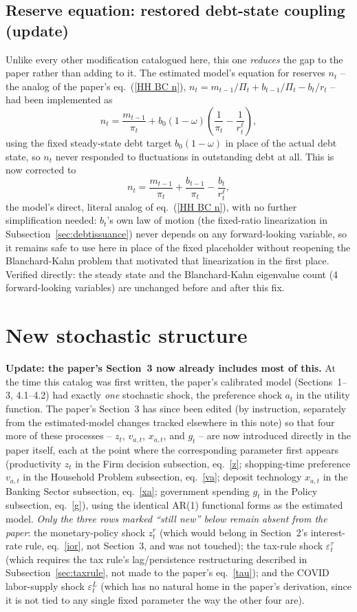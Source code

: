 \documentclass[11pt]{article}
\begin{document}
\subsection{Reserve equation: restored debt-state coupling (update)}
\label{sec:reserve}
Unlike every other modification catalogued here, this one \emph{reduces}
the gap to the paper rather than adding to it. The estimated model's
equation for reserves $n_t$ -- the analog of the paper's
eq.~(\ref{HH BC n}), $n_t = m_{t-1}/\Pi_t + b_{t-1}/\Pi_t - b_t/r_t$ --
had been implemented as
\[
n_t = \frac{m_{t-1}}{\pi_t} + b_0(1-\omega)\left(\frac{1}{\pi_t}-\frac{1}{r^\ell_t}\right),
\]
using the fixed steady-state debt target $b_0(1-\omega)$ in place of the
actual debt state, so $n_t$ never responded to fluctuations in
outstanding debt at all. This is now corrected to
\[
n_t = \frac{m_{t-1}}{\pi_t} + \frac{b_{t-1}}{\pi_t} - \frac{b_t}{r^\ell_t},
\]
the model's direct, literal analog of eq.~(\ref{HH BC n}), with no
further simplification needed: $b_t$'s own law of motion (the fixed-ratio
linearization in Subsection~\ref{sec:debtissuance}) never depends on any forward-looking
variable, so it remains safe to use here in place of the fixed
placeholder without reopening the Blanchard-Kahn problem that motivated
that linearization in the first place. Verified directly: the steady
state and the Blanchard-Kahn eigenvalue count (4 forward-looking
variables) are unchanged before and after this fix.

\section{New stochastic structure}

\textbf{Update: the paper's Section~3 now already includes most of
this.} At the time this catalog was first written, the paper's
calibrated model (Sections~1--3, 4.1--4.2) had exactly \emph{one}
stochastic shock, the preference shock $a_t$ in the utility function.
The paper's Section~3 has since been edited (by instruction, separately
from the estimated-model changes tracked elsewhere in this note) so
that four more of these processes -- $z_t$, $v_{a,t}$, $x_{a,t}$, and
$g_t$ -- are now introduced directly in the paper itself, each at the
point where the corresponding parameter first appears (productivity
$z_t$ in the Firm decision subsection, eq.~\ref{z}; shopping-time
preference $v_{a,t}$ in the Household Problem subsection, eq.~\ref{va};
deposit technology $x_{a,t}$ in the Banking Sector subsection,
eq.~\ref{xa}; government spending $g_t$ in the Policy subsection,
eq.~\ref{g}), using the identical AR(1) functional forms as the
estimated model. \emph{Only the three rows marked ``still new'' below
remain absent from the paper}: the monetary-policy shock $z^r_t$ (which
would belong in Section~2's interest-rate rule, eq.~\ref{ior}, not
Section~3, and was not touched); the tax-rule shock
$\varepsilon^\tau_t$ (which requires the tax rule's lag/persistence
restructuring described in Subsection~\ref{sec:taxrule}, not made to
the paper's eq.~\ref{tau}); and the COVID labor-supply shock
$\varepsilon^L_t$ (which has no natural home in the paper's derivation,
since it is not tied to any single fixed parameter the way the other
four are).
\end{document}
